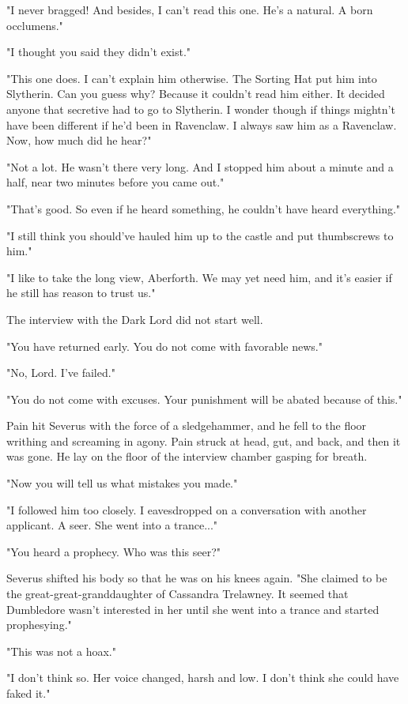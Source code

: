 \documentclass[a4paper,11pt]{article}
\begin{document}
"I never bragged! And besides, I can't read this one. He's a natural. A born occlumens."

"I thought you said they didn't exist."

"This one does. I can't explain him otherwise. The Sorting Hat put him into Slytherin. Can you guess why? Because it couldn't read him either. It decided anyone that secretive had to go to Slytherin. I wonder though if things mightn't have been different if he'd been in Ravenclaw. I always saw him as a Ravenclaw. Now, how much did he hear?"

"Not a lot. He wasn't there very long. And I stopped him about a minute and a half, near two minutes before you came out."

"That's good. So even if he heard something, he couldn't have heard everything."

"I still think you should've hauled him up to the castle and put thumbscrews to him."

"I like to take the long view, Aberforth. We may yet need him, and it's easier if he still has reason to trust us."

The interview with the Dark Lord did not start well.

"You have returned early. You do not come with favorable news."

"No, Lord. I've failed."

"You do not come with excuses. Your punishment will be abated because of this."

Pain hit Severus with the force of a sledgehammer, and he fell to the floor writhing and screaming in agony. Pain struck at head, gut, and back, and then it was gone. He lay on the floor of the interview chamber gasping for breath.

"Now you will tell us what mistakes you made."

"I followed him too closely. I eavesdropped on a conversation with another applicant. A seer. She went into a trance..."

"You heard a prophecy. Who was this seer?"

Severus shifted his body so that he was on his knees again. "She claimed to be the great-great-granddaughter of Cassandra Trelawney. It seemed that Dumbledore wasn't interested in her until she went into a trance and started prophesying."

"This was not a hoax."

"I don't think so. Her voice changed, harsh and low. I don't think she could have faked it."
\end{document}
